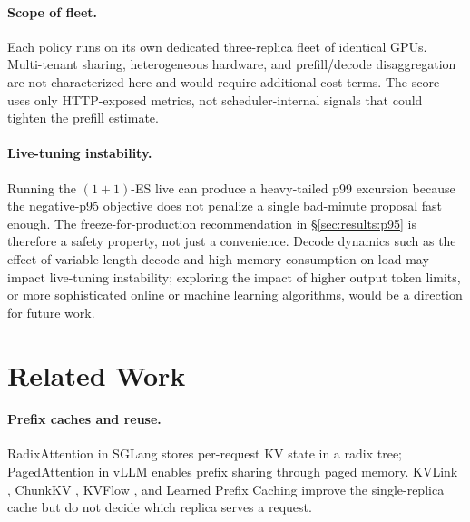 \documentclass{article}
\begin{document}
\paragraph{Scope of fleet.}
Each policy runs on its own dedicated three-replica fleet of identical GPUs. Multi-tenant sharing, heterogeneous hardware, and prefill/decode disaggregation \citep{distserve2024,splitwise2024} are not characterized here and would require additional cost terms. The score uses only HTTP-exposed metrics, not scheduler-internal signals \citep{kvflow2025,lpc2025} that could tighten the prefill estimate.

\paragraph{Live-tuning instability.}
Running the $(1{+}1)$-ES live can produce a heavy-tailed p99 excursion
because the negative-p95 objective does not penalize a single
bad-minute proposal fast enough. The freeze-for-production recommendation in
\S\ref{sec:results:p95} is therefore a safety property, not just a
convenience. Decode dynamics such as the effect of variable length decode and high memory consumption on load may impact live-tuning instability; exploring the impact of higher output token limits, or more sophisticated online or machine learning algorithms, would be a direction for future work.

\section{Related Work}
\label{sec:related}

\paragraph{Prefix caches and reuse.}
RadixAttention in SGLang \citep{sglang2024} stores per-request KV state in a
radix tree; PagedAttention in vLLM \citep{vllm2023} enables prefix sharing
through paged memory. KVLink \citep{kvlink2025}, ChunkKV \citep{chunkkv2025},
KVFlow \citep{kvflow2025}, and Learned Prefix Caching \citep{lpc2025} improve
the single-replica cache but do not decide which replica serves a request.
\end{document}
